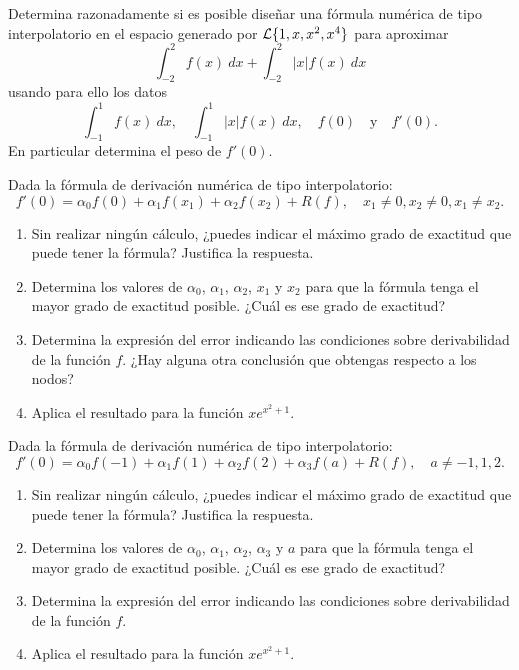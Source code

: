 \begin{ejercicio}\label{ej:2.2.4}
    Determina razonadamente si es posible diseñar una fórmula numérica de tipo interpolatorio en el espacio generado por $\mathcal{L}\{1, x, x^2, x^4\}$ para aproximar
    \[
    \int_{-2}^{2} f(x) \ d{x} + \int_{-2}^{2} |x|f(x) \ d{x}
    \]
    usando para ello los datos
    \[
    \int_{-1}^{1} f(x) \ d{x}, \quad \int_{-1}^{1} |x|f(x) \ d{x}, \quad f(0) \quad \text{y} \quad f'(0).
    \]
    En particular determina el peso de $f'(0)$.
\end{ejercicio}

\begin{ejercicio}\label{ej:2.2.5}
    Dada la fórmula de derivación numérica de tipo interpolatorio:
    \[
    f'(0) = \alpha_0 f(0) + \alpha_1 f(x_1) + \alpha_2 f(x_2) + R(f), \quad x_1 \neq 0, x_2 \neq 0, x_1 \neq x_2.
    \]
    \begin{enumerate}
        \item Sin realizar ningún cálculo, ¿puedes indicar el máximo grado de exactitud que puede tener la fórmula? Justifica la respuesta.
        
        \item Determina los valores de $\alpha_0$, $\alpha_1$, $\alpha_2$, $x_1$ y $x_2$ para que la fórmula tenga el mayor grado de exactitud posible. ¿Cuál es ese grado de exactitud?
        
        \item Determina la expresión del error indicando las condiciones sobre derivabilidad de la función $f$. ¿Hay alguna otra conclusión que obtengas respecto a los nodos?
        
        \item Aplica el resultado para la función $x e^{x^2 + 1}$.
        
    \end{enumerate}
\end{ejercicio}

\begin{ejercicio}\label{ej:2.2.6}
    Dada la fórmula de derivación numérica de tipo interpolatorio:
    \[
    f'(0) = \alpha_0 f(-1) + \alpha_1 f(1) + \alpha_2 f(2) + \alpha_3 f(a) + R(f), \quad a \neq -1, 1, 2.
    \]
    \begin{enumerate}
        \item Sin realizar ningún cálculo, ¿puedes indicar el máximo grado de exactitud que puede tener la fórmula? Justifica la respuesta.
        
        \item Determina los valores de $\alpha_0$, $\alpha_1$, $\alpha_2$, $\alpha_3$ y $a$ para que la fórmula tenga el mayor grado de exactitud posible. ¿Cuál es ese grado de exactitud?
        
        \item Determina la expresión del error indicando las condiciones sobre derivabilidad de la función $f$.
        
        \item Aplica el resultado para la función $x e^{x^2 + 1}$.
        
    \end{enumerate}
\end{ejercicio}